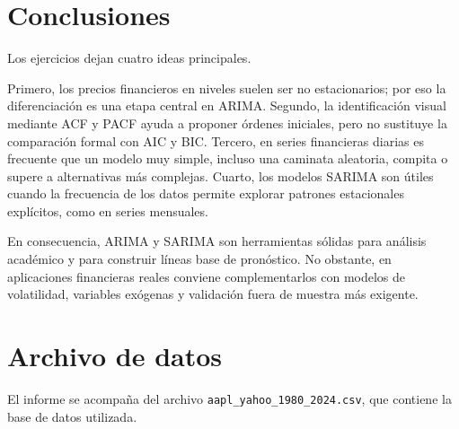 \documentclass[12pt,a4paper]{article}
\begin{document}
\section{Conclusiones}
Los ejercicios dejan cuatro ideas principales.

Primero, los precios financieros en niveles suelen ser no estacionarios; por eso la diferenciación es una etapa central en ARIMA. Segundo, la identificación visual mediante ACF y PACF ayuda a proponer órdenes iniciales, pero no sustituye la comparación formal con AIC y BIC. Tercero, en series financieras diarias es frecuente que un modelo muy simple, incluso una caminata aleatoria, compita o supere a alternativas más complejas. Cuarto, los modelos SARIMA son útiles cuando la frecuencia de los datos permite explorar patrones estacionales explícitos, como en series mensuales.

En consecuencia, ARIMA y SARIMA son herramientas sólidas para análisis académico y para construir líneas base de pronóstico. No obstante, en aplicaciones financieras reales conviene complementarlos con modelos de volatilidad, variables exógenas y validación fuera de muestra más exigente.

\appendix
\section{Archivo de datos}
El informe se acompaña del archivo \texttt{aapl\_yahoo\_1980\_2024.csv}, que contiene la base de datos utilizada.
\end{document}
